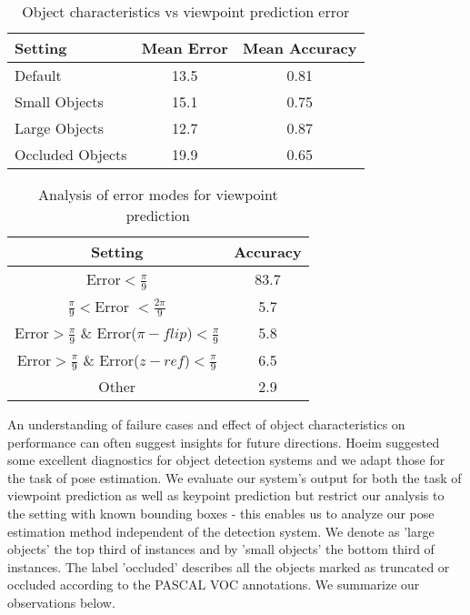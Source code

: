  \begin{table}[htb!]
        \centering
        \begin{tabular}{lcc}
\toprule
\textbf{\footnotesize{}Setting} & \textbf{\footnotesize{}Mean Error} & \textbf{\footnotesize{}Mean Accuracy}\tabularnewline
\midrule
{\footnotesize{}Default} & {\footnotesize{}13.5} & {\footnotesize{}0.81}\tabularnewline
{\footnotesize{}Small Objects} & {\footnotesize{}15.1} & {\footnotesize{}0.75}\tabularnewline
{\footnotesize{}Large Objects} & {\footnotesize{}12.7} & {\footnotesize{}0.87}\tabularnewline
{\footnotesize{}Occluded Objects} & {\footnotesize{}19.9} & {\footnotesize{}0.65}\tabularnewline
\bottomrule
\end{tabular}
        \caption{Object characteristics vs viewpoint prediction error}
        \label{table:vpObjectModes}
    \end{table}

 \begin{table}[htb!]
 \centering
\begin{tabular}{cc}
\toprule
\textbf{\footnotesize{}Setting} & \textbf{\footnotesize{}Accuracy}\tabularnewline
\midrule
{\footnotesize{}Error$<\frac{\pi}{9}$} & {\footnotesize{}83.7}\tabularnewline
{\footnotesize{}$\frac{\pi}{9}<$Error $<\frac{2\pi}{9}$} & {\footnotesize{}5.7}\tabularnewline
{\footnotesize{}Error$>\frac{\pi}{9}$ \& Error($\pi-flip$)$<\frac{\pi}{9}$} & {\footnotesize{}5.8}\tabularnewline
{\footnotesize{}Error$>\frac{\pi}{9}$ \& Error($z-ref$)$<\frac{\pi}{9}$} & {\footnotesize{}6.5}\tabularnewline
{\footnotesize{}Other} & {\footnotesize{}2.9}\tabularnewline
\bottomrule
\end{tabular}
		\caption{Analysis of error modes for viewpoint prediction}
		\label{table:vpErrorModes}        
 \end{table}


An understanding of failure cases and effect of object characteristics on performance can often suggest insights for future directions. Hoeim \etal \cite{hoiem2012diagnosing} suggested some excellent diagnostics for object detection systems and we adapt those  for the task of pose estimation. We evaluate our system's output for both the task of viewpoint prediction as well as keypoint prediction but restrict our analysis to the setting with known bounding boxes - this enables us to analyze our pose estimation method independent of the detection system. We denote as 'large objects' the top third of instances and by 'small objects' the bottom third of instances. The label 'occluded' describes all the objects marked as truncated or occluded according to the PASCAL VOC annotations. We summarize our observations below.

